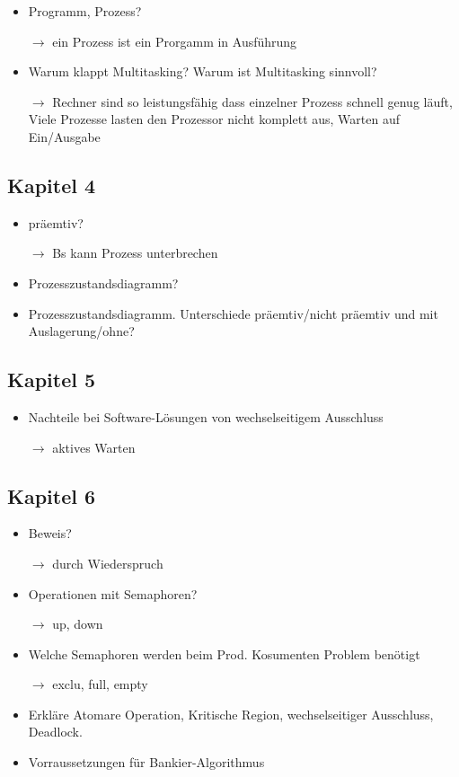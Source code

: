 \documentclass[10pt,a4paper]{article}
\begin{document}
\begin{itemize}
\item Programm, Prozess?
\item[$\rightarrow$] ein Prozess ist ein Prorgamm in Ausführung
\item Warum klappt Multitasking? Warum ist Multitasking sinnvoll?
\item[$\rightarrow$] Rechner sind so leistungsfähig dass einzelner Prozess schnell genug läuft, Viele Prozesse lasten den Prozessor nicht komplett aus, Warten auf Ein/Ausgabe
\end{itemize}

\subsection*{Kapitel 4}
\begin{itemize}
\item präemtiv?
\item[$\rightarrow$] Bs kann Prozess unterbrechen
\item Prozesszustandsdiagramm?
\item Prozesszustandsdiagramm. Unterschiede präemtiv/nicht präemtiv und mit Auslagerung/ohne?
\end{itemize}

\subsection*{Kapitel 5}
\begin{itemize}
\item Nachteile bei Software-Lösungen von wechselseitigem Ausschluss 
\item[$\rightarrow$] aktives Warten
\end{itemize}

\subsection*{Kapitel 6}
\begin{itemize}
\item Beweis?
\item[$\rightarrow$] durch Wiederspruch
\item Operationen mit Semaphoren?
\item[$\rightarrow$] up, down
\item Welche Semaphoren werden beim Prod. Kosumenten Problem benötigt
\item[$\rightarrow$] exclu, full, empty
\item Erkläre Atomare Operation, Kritische Region, wechselseitiger Ausschluss, Deadlock.
\item Vorraussetzungen für Bankier-Algorithmus
\end{itemize}
\end{document}
